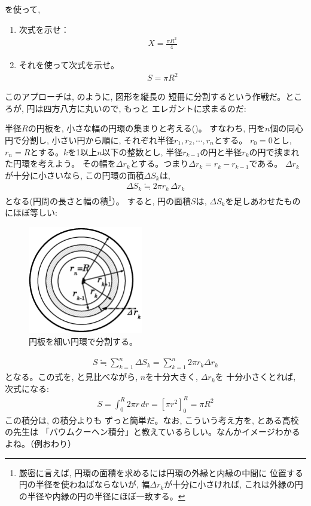 \begin{q}\label{q:int_circle1} を使って, 
\begin{enumerate}
\item 次式を示せ：
\begin{eqnarray}X=\frac{\pi R^2}{4}\end{eqnarray}
\item それを使って次式を示せ。
\begin{eqnarray}S=\pi R^2\label{eq:circlearea}\end{eqnarray}
\end{enumerate}\end{q}
\mv

このアプローチは, のように, 図形を縦長の
短冊に分割するという作戦だ。ところが, 円は四方八方に丸いので, もっと
エレガントに求まるのだ:

\begin{exmpl}\label{exmpl:surface_circle0} 半径$R$の円板を, 
小さな幅の円環の集まりと考える()。
すなわち, 円を$n$個の同心円で分割し, 
小さい円から順に, それぞれ半径$r_1, r_2, \cdots, r_n$とする。
$r_0=0$とし, $r_n=R$とする。$k$を1以上$n$以下の整数とし, 
半径$r_{k-1}$の円と半径$r_k$の円で挟まれた円環を考えよう。
その幅を$\Delta r_k$とする。つまり$\Delta r_k=r_k-r_{k-1}$である。
$\Delta r_k$が十分に小さいなら, この円環の面積$\Delta S_k$は, 
\begin{eqnarray} 
\Delta S_k\fallingdotseq 2\pi r_k\,\Delta r_k
\end{eqnarray}
となる(円周の長さと幅の積\footnote{
厳密に言えば, 円環の面積を求めるには円環の外縁と内縁の中間に
位置する円の半径を使わねばならないが, 幅$\Delta r_k$が十分に小さければ, 
これは外縁の円の半径や内縁の円の半径にほぼ一致する。}）。
すると, 円の面積$S$は, $\Delta S_k$を足しあわせたものにほぼ等しい:
\begin{figure}[h]
    \centering
    \includegraphics[width=5cm]{circlearea_ring.eps}
    \caption{円板を細い円環で分割する。}\label{fig:circlearea_ring}
\end{figure}
\begin{eqnarray}
S\fallingdotseq \sum_{k=1}^{n}\Delta S_k=\sum_{k=1}^{n}2\pi r_k \Delta r_k
\end{eqnarray}
となる。この式を, と見比べながら, $n$を十分大きく, $\Delta r_k$を
十分小さくとれば, 次式になる:
\begin{eqnarray}
S=\int_{0}^{R}2\pi r\,dr=[\pi r^2]_0^R=\pi R^2\label{eq:circlearea_ring_int}
\end{eqnarray}
この積分は, の積分よりも
ずっと簡単だ。なお, こういう考え方を, とある高校の先生は
「バウムクーヘン積分」と教えているらしい。なんかイメージわかるよね。（例おわり）
\end{exmpl}\mv

